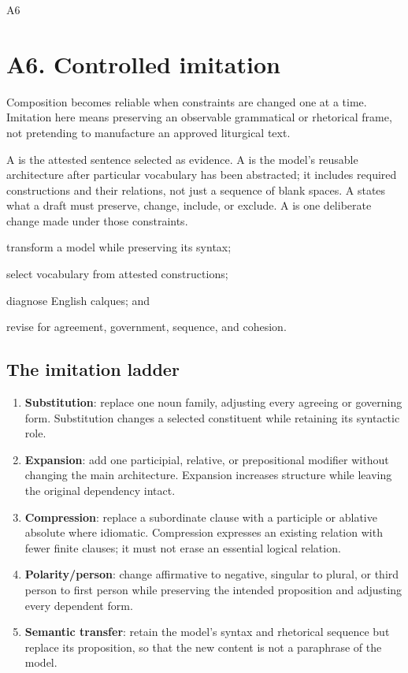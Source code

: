 \begin{courseunit}{A6}
\chapter{A6. Controlled imitation}

Composition becomes reliable when constraints are changed one at a time.
Imitation here means preserving an observable grammatical or rhetorical frame,
not pretending to manufacture an approved liturgical text.

A  is the attested sentence selected as evidence. A 
is the model's reusable architecture after particular vocabulary has been
abstracted; it includes required constructions and their relations, not just a
sequence of blank spaces. A  states what a draft must
preserve, change, include, or exclude. A  is one
deliberate change made under those constraints.

\begin{learningobjectives}
  \item transform a model while preserving its syntax;
  \item select vocabulary from attested constructions;
  \item diagnose English calques; and
  \item revise for agreement, government, sequence, and cohesion.
\end{learningobjectives}

\section{The imitation ladder}

\begin{enumerate}
  \item \textbf{Substitution}: replace one noun family, adjusting every agreeing
        or governing form. Substitution changes a selected constituent while
        retaining its syntactic role.
  \item \textbf{Expansion}: add one participial, relative, or prepositional
        modifier without changing the main architecture. Expansion increases
        structure while leaving the original dependency intact.
  \item \textbf{Compression}: replace a subordinate clause with a participle or
        ablative absolute where idiomatic. Compression expresses an existing
        relation with fewer finite clauses; it must not erase an essential
        logical relation.
  \item \textbf{Polarity/person}: change affirmative to negative, singular to
        plural, or third person to first person while preserving the intended
        proposition and adjusting every dependent form.
  \item \textbf{Semantic transfer}: retain the model's syntax and rhetorical
        sequence but replace its proposition, so that the new content is not a
        paraphrase of the model.
\end{enumerate}


\end{courseunit}
